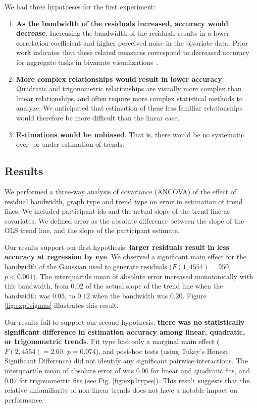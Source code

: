 \documentclass{sigchi}
\begin{document}
We had three hypotheses for the first experiment:
\begin{enumerate}
	\item \textbf{As the bandwidth of the residuals increased, accuracy would decrease}. Increasing the bandwidth of the residuals results in a lower correlation coefficient and higher perceived noise in the bivariate data. Prior work indicates that these related measures correspond to decreased accuracy for aggregate tasks in bivariate visualizations~\cite{albers2014task, harrison2014ranking}.
	\item \textbf{More complex relationships would result in lower accuracy}. Quadratic and trigonometric relationships are visually more complex than linear relationships, and often require more complex statistical methods to analyze. We anticipated that estimation of these less familiar relationships would therefore be more difficult than the linear case.
	\item \textbf{Estimations would be unbiased}. That is, there would be no systematic over- or under-estimation of trends.
\end{enumerate}

\subsection{Results}

\expOnesigmasFig

\expOnetypesFig

We performed a three-way analysis of covariance (ANCOVA) of the effect of residual bandwidth, graph type and trend type on error in estimation of trend lines. We included participant ids and the actual slope of the trend line as covariates. We defined error as the absolute difference between the slope of the OLS trend line, and the slope of the participant estimate.

Our results support our first hypothesis: \textbf{larger residuals result in less accuracy at regression by eye}.  We observed a significant main effect for the bandwidth of the Gaussian used to generate residuals ($F(1,4554)=950$, $p<0.001$). The interquartile mean of absolute error increased monotonically with this bandwidth, from $0.02$ of the actual slope of the trend line when the bandwidth was $0.05$, to $0.12$ when the bandwidth was $0.20$. Figure \ref{fig:exp1sigmas} illustrates this result.

Our results fail to support our second hypothesis: \textbf{there was no statistically significant difference in estimation accuracy among linear, quadratic, or trigonometric trends}. Fit type had only a marginal main effect ($F(2,4554)=2.60$, $p=0.074$), and post-hoc tests (using Tukey's Honest Significant Difference) did not identify any significant pairwise interactions. The interquartile mean of absolute error of was $0.06$ for linear and quadratic fits, and $0.07$ for trigonometric fits (see Fig. \ref{fig:exp1types}). This result suggests that the relative unfamiliarity of non-linear trends does not have a notable impact on performance.
\end{document}
